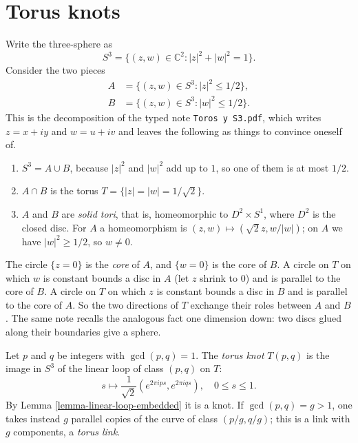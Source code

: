 \section{Torus knots}
\label{section-torus-knots}

\noindent
Write the three-sphere as
$$
S^3=\{(z,w)\in\mathbb{C}^2:
|z|^{2}+|w|^{2}=1\}.
$$
Consider the two pieces
$$
\begin{aligned}
A&=\{(z,w)\in S^3:|z|^{2}\leq 1/2\},\\
B&=\{(z,w)\in S^3:|w|^{2}\leq 1/2\}.
\end{aligned}
$$
This is the decomposition of the typed
note {\tt Toros y S3.pdf}, which writes
$z=x+iy$ and $w=u+iv$ and leaves the
following as things to convince oneself
of.
\begin{enumerate}
\item $S^3=A\cup B$, because $|z|^{2}$
and $|w|^{2}$ add up to $1$, so one of
them is at most $1/2$.
\item $A\cap B$ is the torus
$T=\{|z|=|w|=1/\sqrt{2}\}$.
\item $A$ and $B$ are {\it solid tori},
that is, homeomorphic to
$D^2\times S^1$, where $D^2$ is the
closed disc. For $A$ a homeomorphism
is $(z,w)\mapsto(\sqrt{2}z,w/|w|)$; on
$A$ we have $|w|^{2}\geq 1/2$, so
$w\neq 0$.
\end{enumerate}
The circle $\{z=0\}$ is the {\it core}
of $A$, and $\{w=0\}$ is the core of
$B$. A circle on $T$ on which $w$ is
constant bounds a disc in $A$ (let $z$
shrink to $0$) and is parallel to the
core of $B$. A circle on $T$ on which
$z$ is constant bounds a disc in $B$
and is parallel to the core of $A$. So
the two directions of $T$ exchange
their roles between $A$ and $B$
\cite[Proposition 7.2.3]{murasugi}.
The same note recalls the analogous
fact one dimension down: two discs
glued along their boundaries give a
sphere.

\medskip\noindent
Let $p$ and $q$ be integers with
$\gcd(p,q)=1$. The {\it torus knot}
$T(p,q)$ is the image in $S^3$ of the
linear loop of class $(p,q)$ on $T$:
$$
s\mapsto\frac{1}{\sqrt{2}}
\left(e^{2\pi ips},e^{2\pi iqs}\right),
\quad 0\leq s\leq 1.
$$
By
Lemma \ref{lemma-linear-loop-embedded}
it is a knot. If $\gcd(p,q)=g>1$, one
takes instead $g$ parallel copies of
the curve of class $(p/g,q/g)$; this is
a link with $g$ components, a
{\it torus link}.

